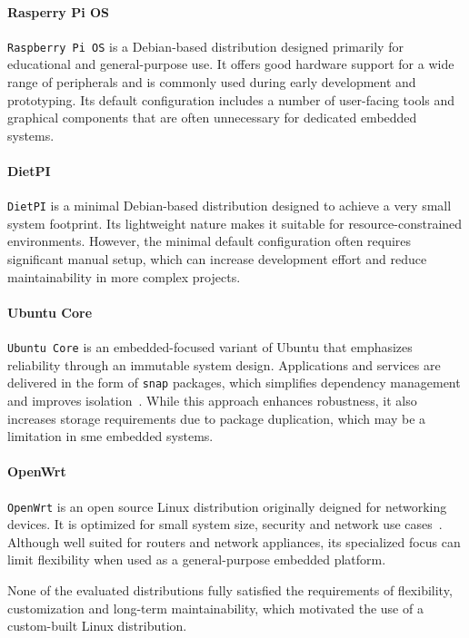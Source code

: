 \paragraph{Rasperry Pi OS}
\verb|Raspberry Pi OS| is a Debian-based distribution designed primarily for educational and
general-purpose use. It offers good hardware support for a wide range of peripherals and is commonly
used during early development and prototyping. Its default configuration includes a number
of user-facing tools and graphical components that are often unnecessary for dedicated embedded systems.

\paragraph{DietPI}
\verb|DietPI| is a minimal Debian-based distribution designed to achieve a very small system footprint.
Its lightweight nature makes it suitable for resource-constrained environments.
However, the minimal default configuration often requires significant manual setup, which
can increase development effort and reduce maintainability in more complex projects.

\paragraph{Ubuntu Core}
\verb|Ubuntu Core| is an embedded-focused variant of Ubuntu that emphasizes reliability through an immutable
system design. Applications and services are delivered in the form of \verb|snap| packages, which simplifies
dependency management and improves isolation~\cite{ubuntu-core-manual}.
While this approach enhances robustness, it also increases storage requirements due to package duplication,
which may be a limitation in sme embedded systems.

\paragraph{OpenWrt}
\verb|OpenWrt| is an open source Linux distribution originally deigned for networking devices.
It is optimized for small system size, security and network use cases~\cite{openwrt-manual}.
Although well suited for routers and network appliances, its specialized focus can limit flexibility
when used as a general-purpose embedded platform.

None of the evaluated distributions fully satisfied the requirements of flexibility,
customization and long-term maintainability, which motivated the use of a custom-built Linux distribution.


